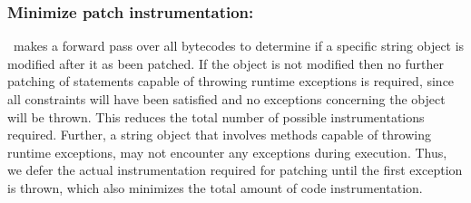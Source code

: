 \subsubsection{Minimize patch instrumentation: }
\label{subsubsec:minimizePatchInstrumentation}
% 
\tool\ makes a forward pass over all bytecodes to determine if a specific string
object is modified after it as been patched. If the object is not modified then
no further patching of statements capable of throwing runtime exceptions is
required, since all constraints will have been satisfied and no exceptions
concerning the object will be thrown. This reduces the total number of possible
instrumentations required. Further, a string object that involves methods
capable of throwing runtime exceptions, may not encounter any exceptions during
execution. Thus, we defer the actual instrumentation required for patching until
the first exception is thrown, which also minimizes the total amount of code
instrumentation.

